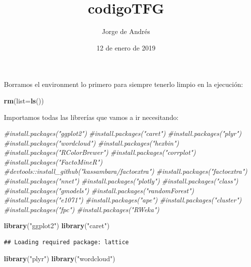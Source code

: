 \documentclass[]{article}
\title{codigoTFG}
\author{Jorge de Andrés}
\date{12 de enero de 2019}
\newenvironment{Shaded}{\begin{snugshade}}{\end{snugshade}}
\newcommand{\KeywordTok}[1]{\textcolor[rgb]{0.13,0.29,0.53}{\textbf{#1}}}
\newcommand{\DataTypeTok}[1]{\textcolor[rgb]{0.13,0.29,0.53}{#1}}
\newcommand{\StringTok}[1]{\textcolor[rgb]{0.31,0.60,0.02}{#1}}
\newcommand{\CommentTok}[1]{\textcolor[rgb]{0.56,0.35,0.01}{\textit{#1}}}
\newcommand{\NormalTok}[1]{#1}
\begin{document}
\maketitle

Borramos el environment lo primero para siempre tenerlo limpio en la
ejecución:

\begin{Shaded}
\begin{Highlighting}[]
\KeywordTok{rm}\NormalTok{(}\DataTypeTok{list=}\KeywordTok{ls}\NormalTok{())}
\end{Highlighting}
\end{Shaded}

Importamos todas las librerías que vamos a ir necesitando:

\begin{Shaded}
\begin{Highlighting}[]
\CommentTok{#install.packages("ggplot2")}
\CommentTok{#install.packages("caret")}
\CommentTok{#install.packages("plyr")}
\CommentTok{#install.packages("wordcloud")}
\CommentTok{#install.packages("hexbin")}
\CommentTok{#install.packages("RColorBrewer")}
\CommentTok{#install.packages("corrplot")}
\CommentTok{#install.packages("FactoMineR")}
\CommentTok{#devtools::install_github("kassambara/factoextra")}
\CommentTok{#install.packages("factoextra")}
\CommentTok{#install.packages("nnet")}
\CommentTok{#install.packages("plotly")}
\CommentTok{#install.packages("class")}
\CommentTok{#install.packages("gmodels")}
\CommentTok{#install.packages("randomForest")}
\CommentTok{#install.packages("e1071")}
\CommentTok{#install.packages("ape")}
\CommentTok{#install.packages("cluster")}
\CommentTok{#install.packages("fpc")}
\CommentTok{#install.packages("RWeka")}

\KeywordTok{library}\NormalTok{(}\StringTok{"ggplot2"}\NormalTok{)}
\KeywordTok{library}\NormalTok{(}\StringTok{"caret"}\NormalTok{)}
\end{Highlighting}
\end{Shaded}

\begin{verbatim}
## Loading required package: lattice
\end{verbatim}

\begin{Shaded}
\begin{Highlighting}[]
\KeywordTok{library}\NormalTok{(}\StringTok{"plyr"}\NormalTok{)}
\KeywordTok{library}\NormalTok{(}\StringTok{"wordcloud"}\NormalTok{)}
\end{Highlighting}
\end{Shaded}
\end{document}
